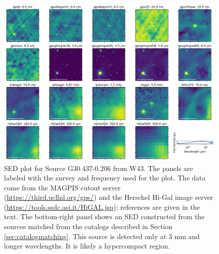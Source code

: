 \documentclass[twocolumn]{aastex62}
\begin{document}



\begin{figure}[htp]
    \includegraphics[width=17cm]{figures/SED_plot_G30.437-0.206.png}
    \caption{SED plot for Source G30.437-0.206 from W43.  The panels are
    labeled with the survey and frequency used for the plot.  The data come
    from the MAGPIS cutout server (\url{https://third.ucllnl.org/gps/}) and the
    Herschel Hi-Gal image server (\url{https://tools.ssdc.asi.it/HiGAL.jsp});
    references are given in the text.  The bottom-right panel shows an SED
    constructed from the sources matched from the catalogs described in Section
    \ref{sec:catalogmatching}.  This source is detected only at 3 mm and longer
    wavelengths.  It is likely a hypercompact \hii region.}
\label{fig:sed83}
\end{figure}


\end{document}
